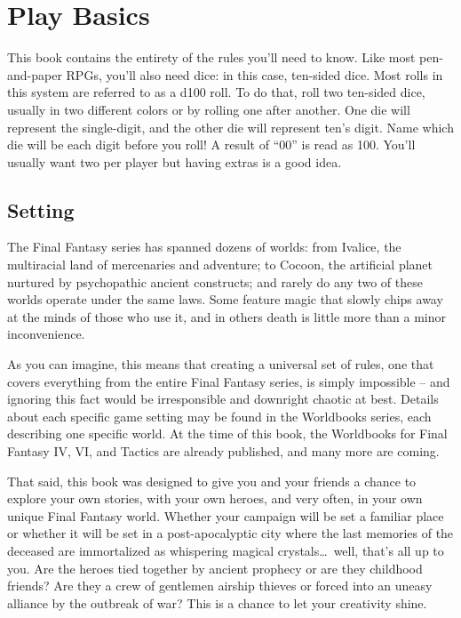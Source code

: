 \section{Play Basics}\label{sec:basics}
\begin{multicols}{2} %
This book contains the entirety of the rules you'll need to know. Like most pen-and-paper RPGs, you'll also need dice: in this case, ten-sided dice. Most rolls in this system are referred to as a d100 roll. To do that, roll two ten-sided dice, usually in two different colors or by rolling one after another. One die will represent the single-digit, and the other die will represent ten's digit. Name which die will be each digit before you roll! A result of “00” is read as 100. You’ll usually want two per player but having extras is a good idea.
\subsection{Setting}\label{subsec:setting}
The Final Fantasy series has spanned dozens of worlds: from Ivalice, the multiracial land of mercenaries and adventure; to Cocoon, the artificial planet nurtured by psychopathic ancient constructs; and rarely do any two of these worlds operate under the same laws. Some feature magic that slowly chips away at the minds of those who use it, and in others death is little more than a minor inconvenience.

As you can imagine, this means that creating a universal set of rules, one that covers everything from the entire Final Fantasy series, is simply impossible – and ignoring this fact would be irresponsible and downright chaotic at best. Details about each specific game setting may be found in the Worldbooks series, each describing one specific world. At the time of this book, the Worldbooks for Final Fantasy IV, VI, and Tactics are already published, and many more are coming.

That said, this book was designed to give you and your friends a chance to explore your own stories, with your own heroes, and very often, in your own unique Final Fantasy world. Whether your campaign will be set a familiar place or whether it will be set in a post-apocalyptic city where the last memories of the deceased are immortalized as whispering magical crystals\ldots{}\ well, that’s all up to you. Are the heroes tied together by ancient prophecy or are they childhood friends? Are they a crew of gentlemen airship thieves or forced into an uneasy alliance by the outbreak of war? This is a chance to let your creativity shine.

\end{multicols}
